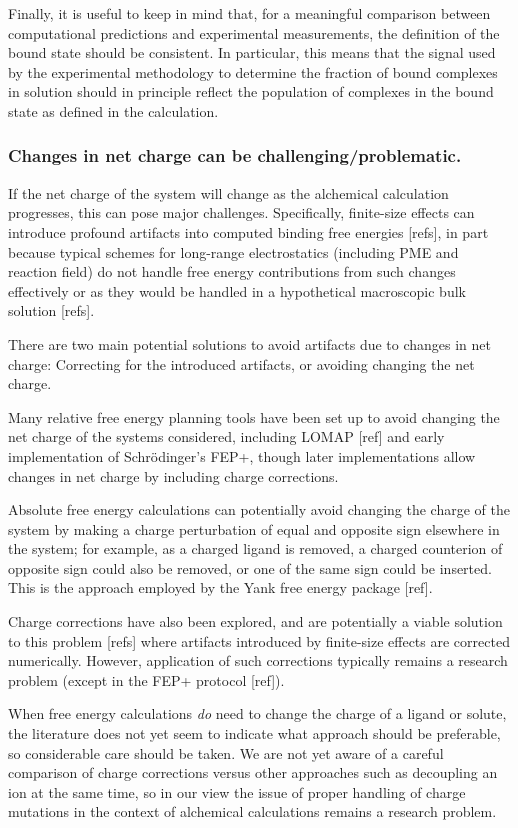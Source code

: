 \documentclass[9pt,bestpractices]{livecoms}
\begin{document}
Finally, it is useful to keep in mind that, for a meaningful comparison between computational predictions and experimental measurements, the definition of the bound state should be consistent.
In particular, this means that the signal used by the experimental methodology to determine the fraction of bound complexes in solution should in principle reflect the population of complexes in the bound state as defined in the calculation.

\subsubsection{Changes in net charge can be challenging/problematic.}

If the net charge of the system will change as the alchemical calculation progresses, this can pose major challenges.
Specifically, finite-size effects can introduce profound artifacts into computed binding free energies [refs], in part because typical schemes for long-range electrostatics (including PME and reaction field) do not handle free energy contributions from such changes effectively or as they would be handled in a hypothetical macroscopic bulk solution [refs].

There are two main potential solutions to avoid artifacts due to changes in net charge: Correcting for the introduced artifacts, or avoiding changing the net charge.

Many relative free energy planning tools have been set up to avoid changing the net charge of the systems considered, including LOMAP [ref] and early implementation of Schr\"{o}dinger's FEP+, though later implementations allow changes in net charge by including charge corrections.

Absolute free energy calculations can potentially avoid changing the charge of the system by making a charge perturbation of equal and opposite sign elsewhere in the system; for example, as a charged ligand is removed, a charged counterion of opposite sign could also be removed, or one of the same sign could be inserted.
This is the approach employed by the Yank free energy package [ref].

Charge corrections have also been explored, and are potentially a viable solution to this problem [refs] where artifacts introduced by finite-size effects are corrected numerically.
However, application of such corrections typically remains a research problem (except in the FEP+ protocol [ref]).

When free energy calculations \emph{do} need to change the charge of a ligand or solute, the literature does not yet seem to indicate what approach should be preferable, so considerable care should be taken.
We are not yet aware of a careful comparison of charge corrections versus other approaches such as decoupling an ion at the same time, so in our view the issue of proper handling of charge mutations in the context of alchemical calculations remains a research problem.
\end{document}
